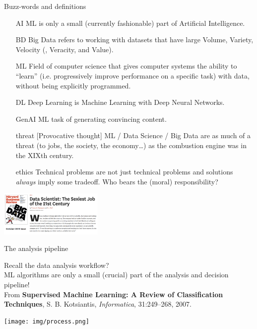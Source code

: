 \documentclass[10pt,a4paper,t,aspectratio=1610,dvipsnames]{beamer}
\begin{document}
\begin{frame}{Buzz-words and definitions}
	\begin{itemize}
		\item[AI] ML is only a small (currently fashionable) part of Artificial Intelligence.
		\item[BD] Big Data refers to working with datasets that have large Volume, Variety, Velocity (, Veracity, and Value).
		\item[ML] Field of computer science that gives computer systems the ability to ``learn'' (i.e. progressively improve performance on a specific task) with data, without being explicitly programmed.
		\item[DL] Deep Learning is Machine Learning with Deep Neural Networks.
		\item[GenAI] ML task of generating convincing content.
		\item[threat] [Provocative thought] ML / Data Science / Big Data are as much of a threat (to jobs, the society, the economy\ldots) as the combustion engine was in the XIXth century.
		\item[ethics] Technical problems are not just technical problems and solutions \emph{always} imply some tradeoff. Who bears the (moral) responsibility?
	\end{itemize}
	\begin{center}
		\includegraphics[width=5cm]{img/datascientist.png}
	\end{center}
\end{frame}

\begin{frame}{The analysis pipeline}
	\vfill
	\begin{minipage}{.55\textwidth}
		Recall the data analysis workflow?\\
		ML algorithms are only a small (crucial) part of the analysis and decision pipeline!\\
		
		\vspace{10em}
		{\scriptsize From \textbf{Supervised Machine Learning: A Review of Classification Techniques}, S. B. Kotsiantis, \textit{Informatica}, 31:249--268, 2007.}
	\end{minipage} 
	\begin{minipage}{.4\textwidth}
		\texttt{[image: img/process.png]}
	\end{minipage}
\end{frame}
\end{document}
